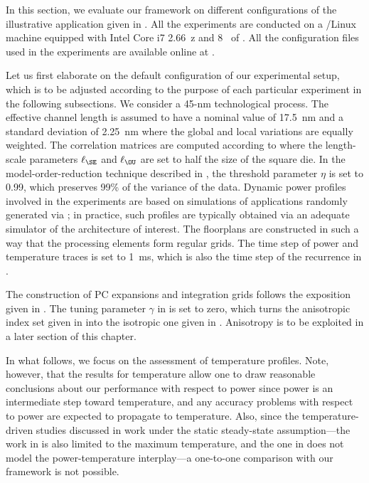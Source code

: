 In this section, we evaluate our framework on different configurations of the
illustrative application given in . All the
experiments are conducted on a /Linux machine equipped with Intel Core
i7 2.66~z and 8~ of . All the configuration files used in
the experiments are available online at \cite{eslab2014b}.

Let us first elaborate on the default configuration of our experimental setup,
which is to be adjusted according to the purpose of each particular experiment
in the following subsections. We consider a 45-nm technological process. The
effective channel length is assumed to have a nominal value of 17.5~nm
\cite{ptm} and a standard deviation of 2.25~nm where the global and local
variations are equally weighted. The correlation matrices are computed according
to  where the length-scale parameters $\ell_\SE$ and
$\ell_\OU$ are set to half the size of the square die. In the
model-order-reduction technique described in ,
the threshold parameter $\eta$ is set to 0.99, which preserves 99\% of the
variance of the data. Dynamic power profiles involved in the experiments are
based on simulations of applications randomly generated via 
\cite{dick1998}; in practice, such profiles are typically obtained via an
adequate simulator of the architecture of interest. The floorplans are
constructed in such a way that the processing elements form regular grids. The
time step of power and temperature traces is set to 1~ms, which is also the time
step of the recurrence in .

The construction of \ac{PC} expansions and integration grids follows the
exposition given in . The tuning parameter $\gamma$ in
 is set to zero, which turns the anisotropic
index set given in  into the isotropic one
given in . Anisotropy is to be exploited in a
later section of this chapter.

In what follows, we focus on the assessment of temperature profiles. Note,
however, that the results for temperature allow one to draw reasonable
conclusions about our performance with respect to power since power is an
intermediate step toward temperature, and any accuracy problems with respect to
power are expected to propagate to temperature. Also, since the
temperature-driven studies \cite{huang2009a, juan2011, juan2012, lee2013}
discussed in  work under the static steady-state
assumption---the work in \cite{juan2011} is also limited to the maximum
temperature, and the one in \cite{huang2009a} does not model the
power-temperature interplay---a one-to-one comparison with our framework is not
possible.


